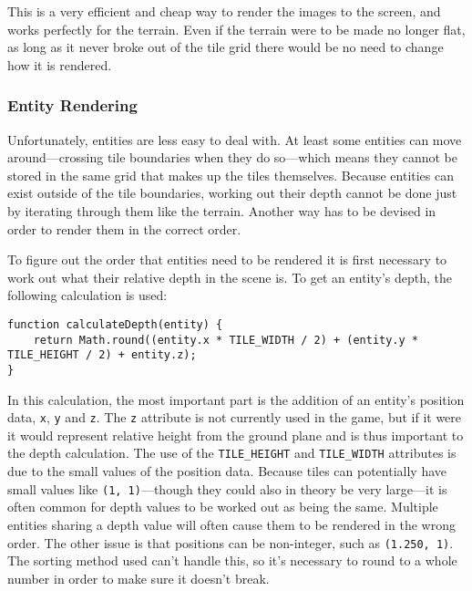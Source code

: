 
This is a very efficient and cheap way to render the images to the screen, and works perfectly for the terrain. Even if the terrain were to be made no longer flat, as long as it never broke out of the tile grid there would be no need to change how it is rendered.

\subsubsection{Entity Rendering}\label{entity_rendering}
Unfortunately, entities are less easy to deal with. At least some entities can move around---crossing tile boundaries when they do so---which means they cannot be stored in the same grid that makes up the tiles themselves. Because entities can exist outside of the tile boundaries, working out their depth cannot be done just by iterating through them like the terrain. Another way has to be devised in order to render them in the correct order.

To figure out the order that entities need to be rendered it is first necessary to work out what their relative depth in the scene is. To get an entity's depth, the following calculation is used:

\noindent
\begin{minipage}{\linewidth}
\begin{lstlisting}[style=js, caption={Calculation to work out an entity's relative depth in the scene.}, label=calculate_depth]
function calculateDepth(entity) {
    return Math.round((entity.x * TILE_WIDTH / 2) + (entity.y * TILE_HEIGHT / 2) + entity.z);
}
\end{lstlisting}
\end{minipage}

In this calculation, the most important part is the addition of an entity's position data, \texttt{x}, \texttt{y} and \texttt{z}. The \texttt{z} attribute is not currently used in the game, but if it were it would represent relative height from the ground plane and is thus important to the depth calculation. The use of the \texttt{TILE\_HEIGHT} and \texttt{TILE\_WIDTH} attributes is due to the small values of the position data. Because tiles can potentially have small values like \texttt{(1, 1)}---though they could also in theory be very large---it is often common for depth values to be worked out as being the same. Multiple entities sharing a depth value will often cause them to be rendered in the wrong order. The other issue is that positions can be non-integer, such as \texttt{(1.250, 1)}. The sorting method used can't handle this, so it's necessary to round to a whole number in order to make sure it doesn't break.

